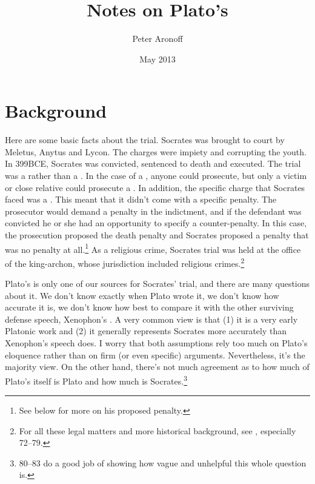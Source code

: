 \documentclass[11pt]{article}
\begin{document}
\begin{titlepage}
\title{Notes on Plato's }
\author{Peter Aronoff}
\date{May 2013}
\maketitle
\end{titlepage}

\section{Background}

Here are some basic facts about the trial.  Socrates was brought to court by Meletus, Anytus and Lycon.  The charges were impiety and corrupting the youth.  In 399BCE, Socrates was convicted, sentenced to death and executed.  The trial was a  rather than a .  In the case of a , anyone could prosecute, but only a victim or close relative could prosecute a .  In addition, the specific charge that Socrates faced was a .  This meant that it didn't come with a specific penalty.  The prosecutor would demand a penalty in the indictment, and if the defendant was convicted he or she had an opportunity to specify a counter-penalty.  In this case, the prosecution proposed the death penalty and Socrates proposed a penalty that was no penalty at all.\footnote{See below for more on his proposed penalty.}  As a religious crime, Socrates trial was held at the office of the king-archon, whose jurisdiction included religious crimes.\footnote{For all these legal matters and more historical background, see \citet{brickhouse2004}, especially 72--79.}

Plato's  is only one of our sources for Socrates' trial, and there are many questions about it.  We don't know exactly when Plato wrote it, we don't know how accurate it is, we don't know how best to compare it with the other surviving defense speech, Xenophon's .  A very common view is that (1) it is a very early Platonic work and (2) it generally represents Socrates more accurately than Xenophon's speech does.  I worry that both assumptions rely too much on Plato's eloquence rather than on firm (or even specific) arguments.  Nevertheless, it's the majority view.  On the other hand, there's not much agreement as to how much of Plato's  itself is Plato and how much is Socrates.\footnote{ \citet{brickhouse2004} 80--83 do a good job of showing how vague and unhelpful this whole question is.}
\end{document}
